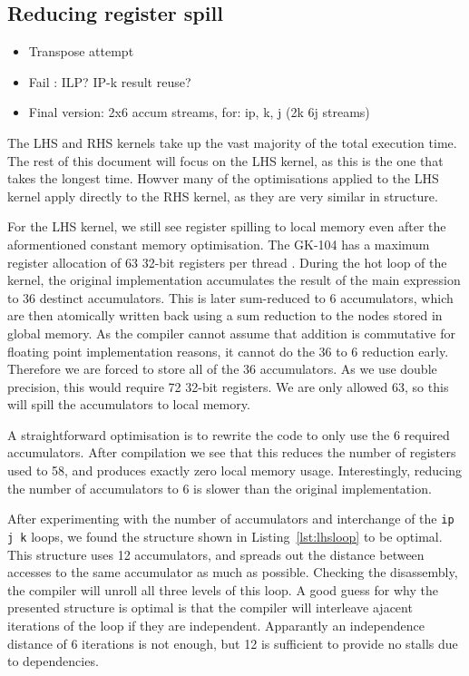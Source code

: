 \documentclass[11pt, oneside, a4paper]{article}
\begin{document}

\subsection{Reducing register spill} %
\label{sub:reducing_register_spill}

\begin{itemize}
	\item Transpose attempt
	\item Fail : ILP? IP-k result reuse?
	\item Final version: 2x6 accum streams, for: ip, k, j (2k 6j streams)
\end{itemize}

The LHS and RHS kernels take up the vast majority of the total execution time.
The rest of this document will focus on the LHS kernel, as this is the one that takes the longest time.
Howver many of the optimisations applied to the LHS kernel apply directly to the RHS kernel, as they are very similar in structure.

For the LHS kernel, we still see register spilling to local memory even after the aformentioned constant memory optimisation.
The GK-104 has a maximum register allocation of 63 32-bit registers per thread \cite{progguide}.
During the hot loop of the kernel, the original implementation accumulates the result of the main expression to 36 destinct accumulators.
This is later sum-reduced to 6 accumulators, which are then atomically written back using a sum reduction to the nodes stored in global memory.
As the compiler cannot assume that addition is commutative for floating point implementation reasons, it cannot do the 36 to 6 reduction early. Therefore we are forced to store all of the 36 accumulators. As we use double precision, this would require 72 32-bit registers.
We are only allowed 63, so this will spill the accumulators to local memory.

A straightforward optimisation is to rewrite the code to only use the 6 required accumulators. After compilation we see that this reduces the number of registers used to 58, and produces exactly zero local memory usage.
Interestingly, reducing the number of accumulators to 6 is slower than the original implementation.

After experimenting with the number of accumulators and interchange of the \verb.ip j k. loops, we found the structure shown in Listing~\ref{lst:lhsloop} to be optimal.
This structure uses 12 accumulators, and spreads out the distance between accesses to the same accumulator as much as possible.
Checking the disassembly, the compiler will unroll all three levels of this loop.
A good guess for why the presented structure is optimal is that the compiler will interleave ajacent iterations of the loop if they are independent.
Apparantly an independence distance of 6 iterations is not enough, but 12 is sufficient to provide no stalls due to dependencies.
\end{document}
